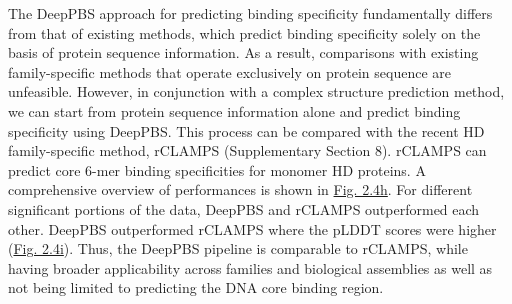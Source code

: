 \par
The DeepPBS approach for predicting binding specificity fundamentally differs from that of existing methods, which predict binding specificity solely on the basis of protein sequence information. As a result, comparisons with existing family-specific methods that operate exclusively on protein sequence are unfeasible. However, in conjunction with a complex structure prediction method, we can start from protein sequence information alone and predict binding specificity using DeepPBS. This process can be compared with the recent HD family-specific method, rCLAMPS \citep{Wetzel2022} (Supplementary Section 8). rCLAMPS can predict core 6-mer binding specificities for monomer HD proteins. A comprehensive overview of performances is shown in \hyperref[fig:pdna3]{Fig. 2.4h}. For different significant portions of the data, DeepPBS and rCLAMPS outperformed each other. DeepPBS outperformed rCLAMPS where the pLDDT scores were higher (\hyperref[fig:pdna3]{Fig. 2.4i}). Thus, the DeepPBS pipeline is comparable to rCLAMPS, while having broader applicability across families and biological assemblies as well as not being limited to predicting the DNA core binding region.

